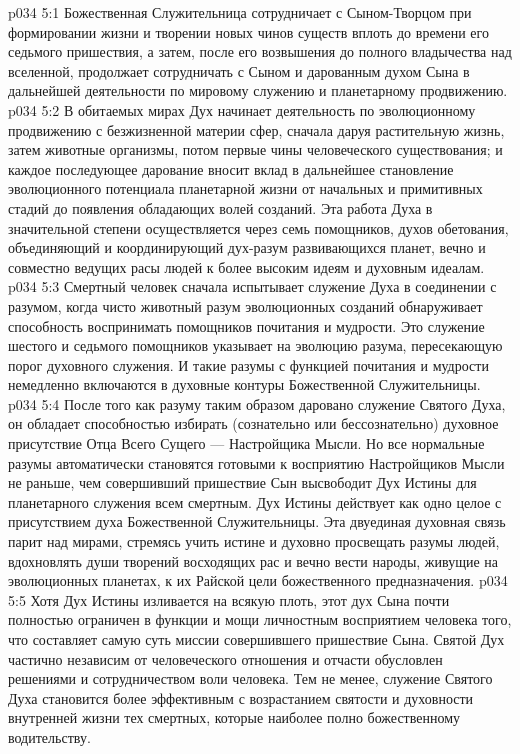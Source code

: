 \vs p034 5:1 Божественная Служительница сотрудничает с Сыном\hyp{}Творцом при формировании жизни и творении новых чинов существ вплоть до времени его седьмого пришествия, а затем, после его возвышения до полного владычества над вселенной, продолжает сотрудничать с Сыном и дарованным духом Сына в дальнейшей деятельности по мировому служению и планетарному продвижению.
\vs p034 5:2 В обитаемых мирах Дух начинает деятельность по эволюционному продвижению с безжизненной материи сфер, сначала даруя растительную жизнь, затем животные организмы, потом первые чины человеческого существования; и каждое последующее дарование вносит вклад в дальнейшее становление эволюционного потенциала планетарной жизни от начальных и примитивных стадий до появления обладающих волей созданий. Эта работа Духа в значительной степени осуществляется через семь помощников, духов обетования, объединяющий и координирующий дух\hyp{}разум развивающихся планет, вечно и совместно ведущих расы людей к более высоким идеям и духовным идеалам.
\vs p034 5:3 \pc Смертный человек сначала испытывает служение Духа в соединении с разумом, когда чисто животный разум эволюционных созданий обнаруживает способность воспринимать помощников почитания и мудрости. Это служение шестого и седьмого помощников указывает на эволюцию разума, пересекающую порог духовного служения. И такие разумы с функцией почитания и мудрости немедленно включаются в духовные контуры Божественной Служительницы.
\vs p034 5:4 После того как разуму таким образом даровано служение Святого Духа, он обладает способностью избирать (сознательно или бессознательно) духовное присутствие Отца Всего Сущего --- Настройщика Мысли. Но все нормальные разумы автоматически становятся готовыми к восприятию Настройщиков Мысли не раньше, чем совершивший пришествие Сын высвободит Дух Истины для планетарного служения всем смертным. Дух Истины действует как одно целое с присутствием духа Божественной Служительницы. Эта двуединая духовная связь парит над мирами, стремясь учить истине и духовно просвещать разумы людей, вдохновлять души творений восходящих рас и вечно вести народы, живущие на эволюционных планетах, к их Райской цели божественного предназначения.
\vs p034 5:5 Хотя Дух Истины изливается на всякую плоть, этот дух Сына почти полностью ограничен в функции и мощи личностным восприятием человека того, что составляет самую суть миссии совершившего пришествие Сына. Святой Дух частично независим от человеческого отношения и отчасти обусловлен решениями и сотрудничеством воли человека. Тем не менее, служение Святого Духа становится более эффективным с возрастанием святости и духовности внутренней жизни тех смертных, которые наиболее полно  божественному водительству.
